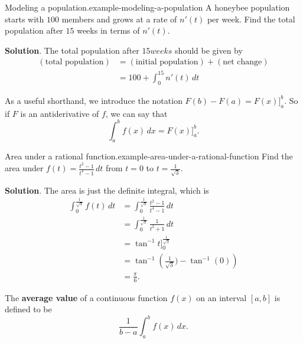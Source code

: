 \documentclass[10pt,]{book}
\newcommand{\terminology}[1]{\textbf{#1}}
\numberwithin{equation}{section}
\begin{document}
\begin{example}{Modeling a population.}{example-modeling-a-population}%
\hypertarget{p-447}{}%
A honeybee population starts with \(100\) members and grows at a rate of \(n'(t)\) per week. Find the total population after \(15\) weeks in terms of \(n'(t)\).%
\par\smallskip%
\noindent\textbf{Solution}.\hypertarget{solution-97}{}\quad%
\hypertarget{p-448}{}%
The total population after \(15 weeks\) should be given by%
\begin{align*}
(\text{total population}) & = (\text{initial population}) + (\text{net change}) \\
& = 100 + \int_{0}^{15}n'(t)\,dt 
\end{align*}
%
\end{example}
\hypertarget{p-449}{}%
As a useful shorthand, we introduce the notation \(F(b) - F(a) = F(x)\big]_{a}^{b}.\) So if \(F\) is an antiderivative of \(f\), we can say that%
\begin{equation*}
\int_{a}^{b}f(x)\,dx = F(x)\big]_{a}^{b}.
\end{equation*}
%
\begin{example}{Area under a rational function.}{example-area-under-a-rational-function}%
\hypertarget{p-450}{}%
Find the area under \(f(t) = \frac{t^{2}-1}{t^{4}-1}\,dt\) from \(t=0\) to \(t=\frac{1}{\sqrt{3}}\).%
\par\smallskip%
\noindent\textbf{Solution}.\hypertarget{solution-98}{}\quad%
\hypertarget{p-451}{}%
The area is just the definite integral, which is%
\begin{align*}
\int_{0}^{\frac{1}{\sqrt{3}}}f(t)\,dt & = \int_{0}^{\frac{1}{\sqrt{3}}}\frac{t^{2}-1}{t^{4}-1}\,dt \\
& = \int_{0}^{\frac{1}{\sqrt{3}}}\frac{1}{t^{2}+1}\,dt \\
& = \tan^{-1}t\big]_{0}^{\frac{1}{\sqrt{3}}} \\
& = \tan^{-1}\left(\frac{1}{\sqrt{3}}) - \tan^{-1}(0)\right) \\
& = \frac{\pi}{6}. 
\end{align*}
%
\end{example}
\hypertarget{p-452}{}%
The \terminology{average value} of a continuous function \(f(x)\) on an interval \([a,b]\) is defined to be%
\begin{equation*}
\frac{1}{b-a}\int_{a}^{b}f(x)\,dx.
\end{equation*}
%
\end{document}
